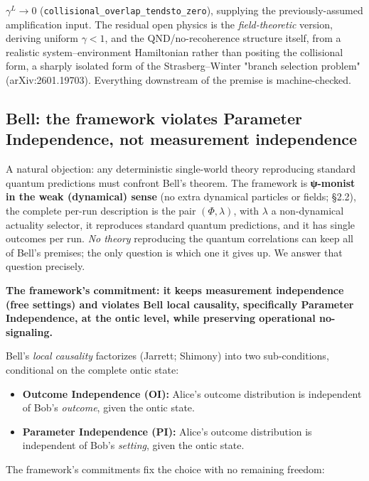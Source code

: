 \documentclass[11pt,a4paper]{article}
\begin{document}
$\gamma^L \to 0$ (\texttt{collisional\_overlap\_tendsto\_zero}), supplying the previously-assumed amplification input. The residual open physics is the \emph{field-theoretic} version, deriving uniform $\gamma<1$, and the QND/no-recoherence structure itself, from a realistic system–environment Hamiltonian rather than positing the collisional form, a sharply isolated form of the Strasberg–Winter "branch selection problem" (arXiv:2601.19703). Everything downstream of the premise is machine-checked.

\subsection{Bell: the framework violates Parameter Independence, not measurement independence}

A natural objection: any deterministic single-world theory reproducing standard quantum predictions must confront Bell's theorem. The framework is \textbf{ψ-monist in the weak (dynamical) sense} (no extra dynamical particles or fields; §2.2), the complete per-run description is the pair $(\Phi, \lambda)$, with $\lambda$ a non-dynamical actuality selector, it reproduces standard quantum predictions, and it has single outcomes per run. \emph{No theory} reproducing the quantum correlations can keep all of Bell's premises; the only question is which one it gives up. We answer that question precisely.

\textbf{The framework's commitment: it keeps measurement independence (free settings) and violates Bell local causality, specifically Parameter Independence, at the ontic level, while preserving operational no-signaling.}

Bell's \emph{local causality} factorizes (Jarrett; Shimony) into two sub-conditions, conditional on the complete ontic state:

\begin{itemize}
  \item \textbf{Outcome Independence (OI):} Alice's outcome distribution is independent of Bob's \emph{outcome}, given the ontic state.
  \item \textbf{Parameter Independence (PI):} Alice's outcome distribution is independent of Bob's \emph{setting}, given the ontic state.
\end{itemize}

The framework's commitments fix the choice with no remaining freedom:
\end{document}
